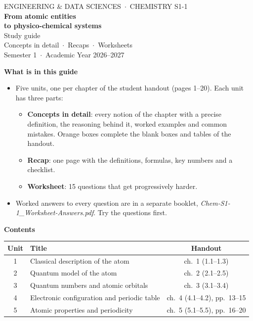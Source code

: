 \thispagestyle{empty}
\vspace*{18mm}
\begin{center}
  {\sffamily\small ENGINEERING \& DATA SCIENCES \,$\cdot$\, CHEMISTRY S1-1}\\[10pt]
  {\sffamily\bfseries\Huge\color{heading} From atomic entities}\\[4pt]
  {\sffamily\bfseries\Huge\color{heading} to physico-chemical systems}\\[12pt]
  {\sffamily\LARGE Study guide}\\[4pt]
  {\large Concepts in detail \,$\cdot$\, Recaps \,$\cdot$\, Worksheets}\\[3pt]
  {\normalsize Semester 1 \,$\cdot$\, Academic Year 2026--2027}
\end{center}
\vspace{10mm}
{\sffamily\bfseries\color{heading} What is in this guide}
\begin{itemize}[leftmargin=7mm, itemsep=3pt]
  \item Five units, one per chapter of the student handout (pages 1--20). Each unit has three parts:
  \begin{itemize}
    \item \textbf{Concepts in detail}: every notion of the chapter with a precise definition, the
          reasoning behind it, worked examples and common mistakes.
          \colorbox{fillcol!20}{Orange boxes} complete the blank boxes and tables of the handout.
    \item \textbf{Recap}: one page with the definitions, formulas, key numbers and a checklist.
    \item \textbf{Worksheet}: 15 questions that get progressively harder.
  \end{itemize}
  \item Worked answers to every question are in a separate booklet,
        \emph{Chem-S1-1\_Worksheet-Answers.pdf}. Try the questions first.
\end{itemize}
\vspace{4mm}
{\sffamily\bfseries\color{heading} Contents}\par\vspace{2mm}
\begin{center}
\renewcommand{\arraystretch}{1.3}
\begin{tabular}{@{}c l c@{}}
\toprule
Unit & Title & Handout\\ \midrule
1 & Classical description of the atom & ch.\ 1 (1.1--1.3)\\
2 & Quantum model of the atom & ch.\ 2 (2.1--2.5)\\
3 & Quantum numbers and atomic orbitals & ch.\ 3 (3.1--3.4)\\
4 & Electronic configuration and periodic table & ch.\ 4 (4.1--4.2), pp.\ 13--15\\
5 & Atomic properties and periodicity & ch.\ 5 (5.1--5.5), pp.\ 16--20\\ \bottomrule
\end{tabular}
\end{center}
